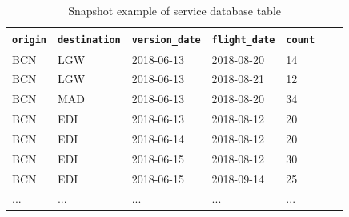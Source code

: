 \begin{table}[H]
\centering
\begin{tabular}{|p{2.5cm}|p{2.5cm}|p{3cm}|p{3cm}|p{2.5cm}|p{2.5cm}|p{1cm}|}
\hline
\texttt{origin}       & \texttt{destination}   & \texttt{version\_date}       & \texttt{flight\_date}        & \texttt{count}       \\ \hline
BCN                   & LGW                    & 2018-06-13                   & 2018-08-20                   & 14                   \\ \hline
BCN                   & LGW                    & 2018-06-13                   & 2018-08-21                   & 12                   \\ \hline
BCN                   & MAD                    & 2018-06-13                   & 2018-08-20                   & 34                   \\ \hline
\cellcolor{blue!5}BCN & \cellcolor{blue!5}EDI  & \cellcolor{blue!5}2018-06-13 & \cellcolor{blue!5}2018-08-12 & \cellcolor{blue!5}20 \\ \hline
\cellcolor{blue!5}BCN & \cellcolor{blue!5}EDI  & \cellcolor{blue!5}2018-06-14 & \cellcolor{blue!5}2018-08-12 & \cellcolor{blue!5}20 \\ \hline
\cellcolor{blue!5}BCN & \cellcolor{blue!5}EDI  & \cellcolor{blue!5}2018-06-15 & \cellcolor{blue!5}2018-08-12 & \cellcolor{blue!5}30 \\ \hline
BCN                   & EDI                    & 2018-06-15                   & 2018-09-14                   & 25                   \\ \hline
...                   & ...                    & ...                          & ...                          & ...                  \\ \hline
\end{tabular}
\caption{Snapshot example of service database table}
\end{table}

